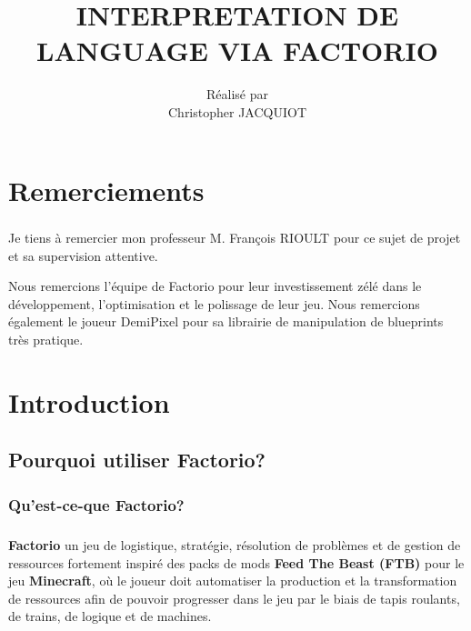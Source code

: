 \documentclass{scrreprt}
\title{\Huge \bfseries INTERPRETATION DE LANGUAGE VIA FACTORIO}
\author{Réalisé par \\Christopher JACQUIOT}
\date{}
\begin{document}
	
	
	
    \maketitle
    
    \tableofcontents
    \listoffigures
    \listoftables
    \chapter*{Remerciements}
	    \paragraph{} 
	    Je tiens à remercier mon professeur M. François RIOULT pour ce sujet de projet et sa supervision attentive.
	    
	    
	    Nous remercions l'équipe de Factorio pour leur investissement zélé dans le développement, l'optimisation et le polissage de leur jeu.
	    Nous remercions également le joueur DemiPixel pour sa librairie de manipulation de blueprints très pratique.
	    	    
    
    \chapter{Introduction}
    	
    	\section{Pourquoi utiliser Factorio?}
    	
    	\subsection{Qu'est-ce-que Factorio?} 
    	
    	\paragraph{}
    	
    	\textbf{Factorio} un jeu de logistique, stratégie, résolution de problèmes et de gestion de ressources fortement inspiré des packs de mods \textbf{Feed The Beast (FTB)} pour le jeu \textbf{Minecraft}, où le joueur doit automatiser la production et la transformation de ressources afin de pouvoir progresser dans le jeu par le biais de tapis roulants, de trains, de logique et de machines.
    	
\end{document}
